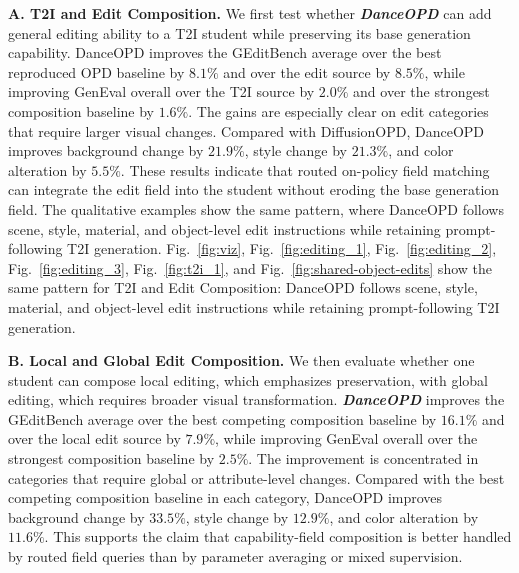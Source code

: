 \documentclass{llmxive}
\providecommand{\name}{\textsl{\textbf{DanceOPD}}\xspace}
\begin{document}
\noindent\textbf{A. T2I and Edit Composition.}
We first test whether \name{} can add general editing ability to a T2I student while preserving its base generation capability. DanceOPD improves the GEditBench average over the best reproduced OPD baseline by $8.1\%$ and over the edit source by $8.5\%$, while improving GenEval overall over the T2I source by $2.0\%$ and over the strongest composition baseline by $1.6\%$. The gains are especially clear on edit categories that require larger visual changes. Compared with DiffusionOPD, DanceOPD improves background change by $21.9\%$, style change by $21.3\%$, and color alteration by $5.5\%$. These results indicate that routed on-policy field matching can integrate the edit field into the student without eroding the base generation field. The qualitative examples show the same pattern, where DanceOPD follows scene, style, material, and object-level edit instructions while retaining prompt-following T2I generation. Fig.~\ref{fig:viz}, Fig.~\ref{fig:editing_1}, Fig.~\ref{fig:editing_2}, Fig.~\ref{fig:editing_3}, Fig.~\ref{fig:t2i_1}, and Fig.~\ref{fig:shared-object-edits} show the same pattern for T2I and Edit Composition: DanceOPD follows scene, style, material, and object-level edit instructions while retaining prompt-following T2I generation.

\noindent\textbf{B. Local and Global Edit Composition.}
We then evaluate whether one student can compose local editing, which emphasizes preservation, with global editing, which requires broader visual transformation. \name{} improves the GEditBench average over the best competing composition baseline by $16.1\%$ and over the local edit source by $7.9\%$, while improving GenEval overall over the strongest composition baseline by $2.5\%$. The improvement is concentrated in categories that require global or attribute-level changes. Compared with the best competing composition baseline in each category, DanceOPD improves background change by $33.5\%$, style change by $12.9\%$, and color alteration by $11.6\%$. This supports the claim that capability-field composition is better handled by routed field queries than by parameter averaging or mixed supervision.
\end{document}
